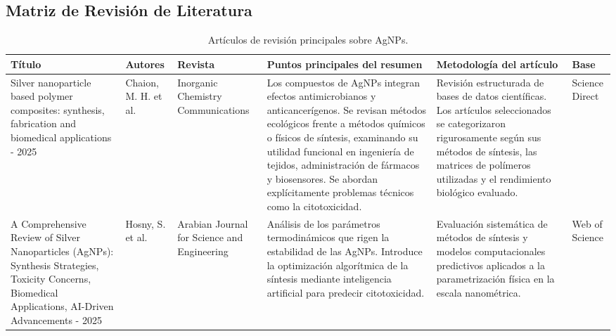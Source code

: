 \documentclass[pdflatex,sn-mathphys-num]{sn-jnl}
\theoremstyle{thmstyleone}%
\theoremstyle{thmstyletwo}%
\theoremstyle{thmstylethree}%
\begin{document}
\newpage
{}
\begin{landscape}
	\section{Matriz de Revisión de Literatura}
	\thispagestyle{empty}

	\begin{table}[htbp!]
		\caption{Artículos de revisión principales sobre AgNPs.}
		\label{tab:matriz_agnps}
		\begin{tabularx}{\linewidth}{
				>{\raggedright\arraybackslash\hsize=1.0\hsize}X
				>{\raggedright\arraybackslash\hsize=0.8\hsize}X
				>{\raggedright\arraybackslash\hsize=1.0\hsize}X
				>{\raggedright\arraybackslash\hsize=1.6\hsize}X
				>{\raggedright\arraybackslash\hsize=1.1\hsize}X
				>{\raggedright\arraybackslash\hsize=0.5\hsize}X
			}
			\toprule
			Título & Autores & Revista & Puntos principales del resumen &
			Metodología del artículo & Base \\
			\midrule
			Silver nanoparticle based polymer composites: synthesis, fabrication
			and biomedical applications - 2025 \cite{chaionSilverNanoparticleBased2025} &
			Chaion, M. H. et al. &
			Inorganic Chemistry Communications &
			Los compuestos de AgNPs integran efectos antimicrobianos y
			anticancerígenos. Se revisan métodos ecológicos frente a
			métodos químicos o físicos de síntesis, examinando su
			utilidad funcional en ingeniería de tejidos, administración de fármacos
			y biosensores. Se abordan explícitamente problemas técnicos
			como la citotoxicidad. &
			Revisión estructurada de bases de datos científicas.
			Los artículos seleccionados se categorizaron rigurosamente según sus
			métodos de síntesis, las matrices de polímeros utilizadas y el
			rendimiento biológico evaluado. &
			Science Direct \\
			\addlinespace
			A Comprehensive Review of Silver Nanoparticles (AgNPs): Synthesis
			Strategies, Toxicity Concerns, Biomedical Applications, AI-Driven
			Advancements - 2025 \cite{hosnyComprehensiveReviewSilver2025} &
			Hosny, S. et al. &
			Arabian Journal for Science and Engineering &
			Análisis de los parámetros termodinámicos que rigen la estabilidad
			de las AgNPs. Introduce la optimización algorítmica de la síntesis
			mediante inteligencia artificial para predecir citotoxicidad. &
			Evaluación sistemática de métodos de síntesis y modelos
			computacionales predictivos aplicados a la parametrización física
			en la escala nanométrica. &
			Web of Science \\

\end{tabularx}
\end{table}
\end{landscape}
\end{document}
